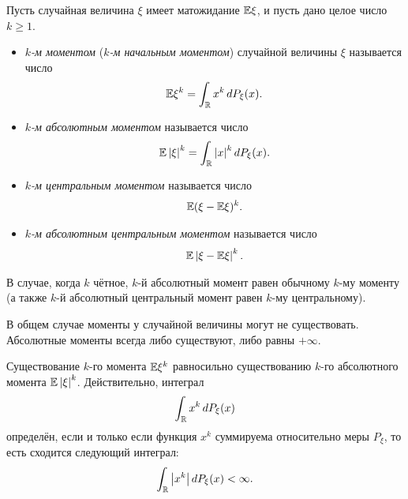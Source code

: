 \documentclass[../main.tex]{subfiles}
\begin{document}
\begin{df}
 Пусть случайная величина $ \xi $ имеет матожидание $ \mathbb E\xi $, и пусть дано целое число $ k \geqslant 1 $.
 \begin{itemize}
  \item \textit{$ k $-м моментом} (\textit{$ k $-м начальным моментом}) случайной величины $ \xi $ называется число
   \begin{align*}
    \mathbb E \xi^{k} = \int_{\mathbb{R}} x^{k}\,dP_\xi(x). 
   \end{align*}
  \item \textit{$ k $-м абсолютным моментом} называется число
   \begin{align*}
    \mathbb E \left| \xi \right|^{k} = \int_{\mathbb{R}} \left| x \right|^{k}dP_\xi(x). 
   \end{align*}
  \item \textit{$ k $-м центральным моментом} называется число
   \begin{align*}
    \mathbb E (\xi - \mathbb E \xi)^{k}.
   \end{align*}
  \item \textit{$ k $-м абсолютным центральным моментом} называется число
   \begin{align*}
    \mathbb E \left| \xi - \mathbb E\xi \right|^{k}.
   \end{align*}
 \end{itemize}
\end{df}

\begin{remrk*}
 В случае, когда $ k $ чётное, $ k $-й абсолютный момент равен обычному $ k $-му моменту (а также $ k $-й абсолютный центральный момент равен $ k $-му центральному).
\end{remrk*}

\begin{remrk*}
 В общем случае моменты у случайной величины могут не существовать. Абсолютные моменты всегда либо существуют, либо равны $ +\infty $.
\end{remrk*}

\begin{remrk}
 Существование $ k $-го момента $\mathbb E\xi^{k}$ равносильно существованию $ k $-го абсолютного момента $ \mathbb E \left|\xi \right|^{k} $. Действительно, интеграл
 \begin{align*}
  \int_{\mathbb{R}} x^{k} \,dP_\xi(x)
 \end{align*} определён, если и только если функция $ x^{k} $ суммируема относительно меры $ P_\xi $, то есть сходится следующий интеграл:
 \begin{align*}
  \int_{\mathbb{R}} \left| x^{k} \right| dP_\xi(x) < \infty.
 \end{align*}
\end{remrk}
\end{document}
